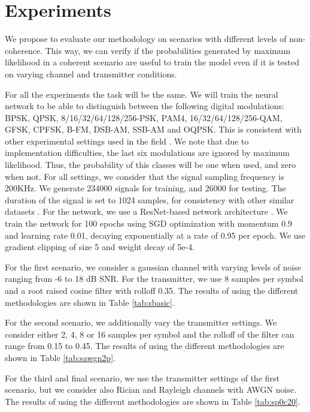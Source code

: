 \documentclass[conference]{IEEEtran}
\begin{document}
\section{Experiments}

We propose to evaluate our methodology on scenarios with different levels of non-coherence. This way, we can verify if the probabilities generated by maximum likelihood in a coherent scenario are useful to train the model even if it is tested on varying channel and transmitter conditions. 

For all the experiments the task will be the same. We will train the neural network to be able to distinguish between the following digital modulations: BPSK, QPSK, 8/16/32/64/128/256-PSK, PAM4, 16/32/64/128/256-QAM, GFSK, CPFSK, B-FM, DSB-AM, SSB-AM and OQPSK. This is consistent with other experimental settings used in the field \cite{}. We note that due to implementation difficulties, the last six modulations are ignored by maximum likelihood. Thus, the probability of this classes will be one when used, and zero when not.
For all settings, we consider that the signal sampling frequency is 200KHz. We generate 234000 signals for training, and 26000 for testing. The duration of the signal is set to 1024 samples, for consistency with other similar datasets \cite{}. For the network, we use a ResNet-based network architecture \cite{}. We train the network for 100 epochs using SGD optimization with momentum 0.9 and learning rate 0.01, decaying exponentially at a rate of 0.95 per epoch. We use gradient clipping of size 5 and weight decay of 5e-4.

For the first scenario, we consider a gaussian channel with varying levels of noise ranging from -6 to 18 dB SNR. For the transmitter, we use 8 samples per symbol and a root raised cosine filter with rolloff 0.35. The results of using the different methodologies are shown in Table \ref{tab:sbasic}.

For the second scenario, we additionally vary the transmitter settings. We consider either 2, 4, 8 or 16 samples per symbol and the rolloff of the filter can range from 0.15 to 0.45. The results of using the different methodologies are shown in Table \ref{tab:sawgn2p}.

For the third and final scenario, we use the transmitter settings of the first scenario, but we consider also Rician and Rayleigh channels with AWGN noise. The results of using the different methodologies are shown in Table \ref{tab:sp0c20}. %
\end{document}
